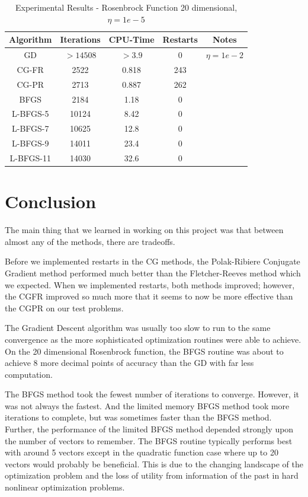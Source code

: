 \documentclass[12pt]{amsart}
\begin{document}
\begin{table}
\caption{Experimental Results - Rosenbrock Function 20 dimensional, $\eta=1e-5$}
\label{results_rosenbrock_20}
\begin{center}
\begin{tabular}{|c||c||c||c||c|}
\hline
Algorithm & Iterations & CPU-Time & Restarts & Notes\\
\hline
GD & $>14508$ & $>3.9$ & 0 & $\eta=1e-2$\\
\hline
CG-FR & 2522 & 0.818 & 243 & \\
\hline
CG-PR & 2713 & 0.887 & 262 & \\
\hline
BFGS & 2184 & 1.18 & 0 & \\
\hline
L-BFGS-5 & 10124 & 8.42 & 0 &\\
\hline
L-BFGS-7 & 10625 & 12.8 & 0 &\\
\hline
L-BFGS-9 & 14011 & 23.4 & 0 &\\
\hline
L-BFGS-11 & 14030 & 32.6 & 0 &\\
\hline
\end{tabular}
\end{center}
\end{table}


\section{Conclusion}
The main thing that we learned in working on this project was that between almost any of the methods, there are tradeoffs.  

Before we implemented restarts in the CG methods, the Polak-Ribiere Conjugate Gradient method performed much better than the Fletcher-Reeves method which we expected.  When we implemented restarts, both methods improved; however, the CGFR improved so much more that it seems to now be more effective than the CGPR on our test problems.  

The Gradient Descent algorithm was usually too slow to run to the same convergence as the more sophisticated optimization routines were able to achieve.  On the 20 dimensional Rosenbrock function, the BFGS routine was about to achieve 8 more decimal points of accuracy than the GD with far less computation.  

The BFGS method took the fewest number of iterations to converge.  However, it was not always the fastest.  And the limited memory BFGS method took more iterations to complete, but was sometimes faster than the BFGS method.  Further, the performance of the limited BFGS method depended strongly upon the number of vectors to remember.  The BFGS routine typically performs best with around 5 vectors except in the quadratic function case where up to 20 vectors would probably be beneficial.  This is due to the changing landscape of the optimization problem and the loss of utility from information of the past in hard nonlinear optimization problems.  
\end{document}
